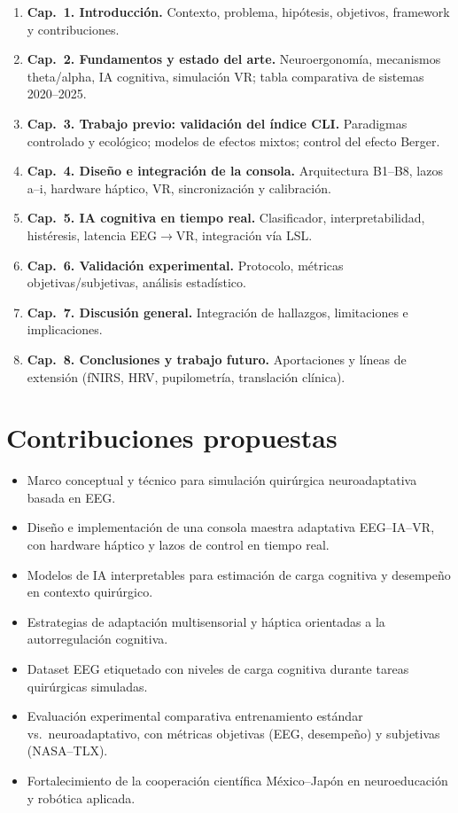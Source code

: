 \documentclass[12pt]{article}
\begin{document}
\begin{enumerate}
    \item \textbf{Cap.\ 1. Introducción.} Contexto, problema,
    hipótesis, objetivos, framework y contribuciones.
    \item \textbf{Cap.\ 2. Fundamentos y estado del arte.}
    Neuroergonomía, mecanismos theta/alpha, IA cognitiva,
    simulación VR; tabla comparativa de sistemas 2020--2025.
    \item \textbf{Cap.\ 3. Trabajo previo: validación del
    índice CLI.} Paradigmas controlado y ecológico; modelos de
    efectos mixtos; control del efecto Berger.
    \item \textbf{Cap.\ 4. Diseño e integración de la consola.}
    Arquitectura B1--B8, lazos a--i, hardware háptico, VR,
    sincronización y calibración.
    \item \textbf{Cap.\ 5. IA cognitiva en tiempo real.}
    Clasificador, interpretabilidad, histéresis, latencia
    EEG$\to$VR, integración vía LSL.
    \item \textbf{Cap.\ 6. Validación experimental.} Protocolo,
    métricas objetivas/subjetivas, análisis estadístico.
    \item \textbf{Cap.\ 7. Discusión general.} Integración de
    hallazgos, limitaciones e implicaciones.
    \item \textbf{Cap.\ 8. Conclusiones y trabajo futuro.}
    Aportaciones y líneas de extensión (fNIRS, HRV,
    pupilometría, translación clínica).
\end{enumerate}


\section{Contribuciones propuestas}

\begin{itemize}
    \item Marco conceptual y técnico para simulación quirúrgica
    neuroadaptativa basada en EEG.
    \item Diseño e implementación de una consola maestra
    adaptativa EEG--IA--VR, con hardware háptico y lazos de
    control en tiempo real.
    \item Modelos de IA interpretables para estimación de carga
    cognitiva y desempeño en contexto quirúrgico.
    \item Estrategias de adaptación multisensorial y háptica
    orientadas a la autorregulación cognitiva.
    \item Dataset EEG etiquetado con niveles de carga cognitiva
    durante tareas quirúrgicas simuladas.
    \item Evaluación experimental comparativa entrenamiento
    estándar vs.\ neuroadaptativo, con métricas objetivas
    (EEG, desempeño) y subjetivas (NASA--TLX).
    \item Fortalecimiento de la cooperación científica
    México--Japón en neuroeducación y robótica aplicada.
\end{itemize}
\end{document}
